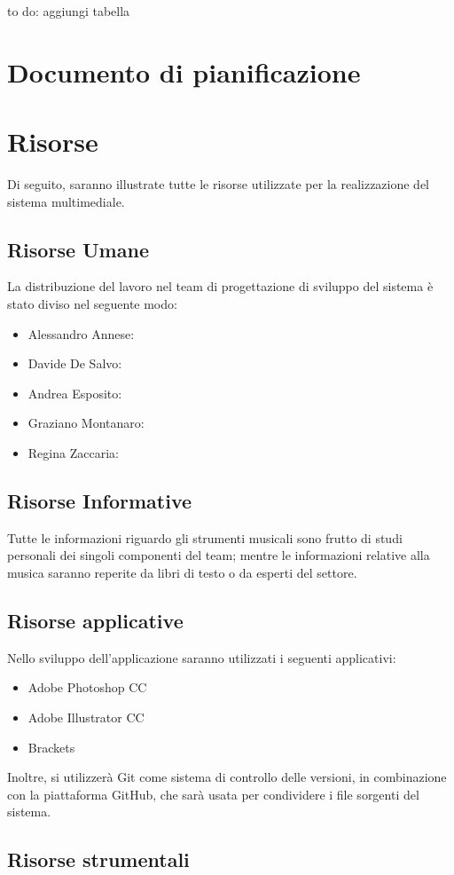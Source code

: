 to do: aggiungi tabella
\section{Documento di pianificazione}
\section{Risorse}
Di seguito, saranno illustrate tutte le risorse utilizzate per la realizzazione del sistema multimediale.
\subsection{Risorse Umane}
La distribuzione del lavoro nel team di progettazione di sviluppo del sistema è stato diviso nel seguente modo:
\begin{itemize}
	\item Alessandro Annese: 
	\item Davide De Salvo:
	\item Andrea Esposito:
	\item Graziano Montanaro:
	\item Regina Zaccaria:
\end{itemize}

\subsection{Risorse Informative}
Tutte le informazioni riguardo gli strumenti musicali sono frutto di studi personali dei singoli componenti del team; mentre le informazioni relative alla musica saranno reperite da libri di testo o da esperti del settore.

\subsection{Risorse applicative}
Nello sviluppo dell'applicazione saranno utilizzati i seguenti applicativi:
\begin{itemize}
	\item Adobe Photoshop CC
	\item Adobe Illustrator CC
	\item Brackets
\end{itemize}
Inoltre, si utilizzerà Git come sistema di controllo delle versioni, in combinazione con la piattaforma GitHub, che sarà usata per condividere i file sorgenti del sistema.

\subsection{Risorse strumentali}

